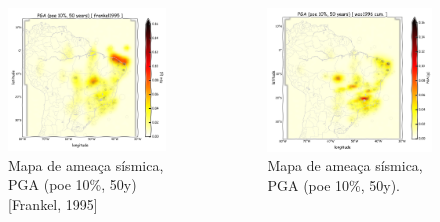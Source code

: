 \documentclass[final]{beamer}
\begin{document}
\begin{poster}
\begin{columns}[t,totalwidth=\textwidth]



\begin{figure}[H]
  \centering
  \includegraphics[width=.98\textwidth]{pga_frankel} 
  \caption{Mapa de ameaça sísmica, PGA (poe 10\%, 50y) [Frankel, 1995] }
  \label{fig:pga_fran} 
\end{figure}

\begin{figure}[H]
	\centering
	\includegraphics[width=.98\textwidth]{pga_woo_cum} 
	\caption{Mapa de ameaça sísmica, PGA (poe 10\%, 50y).}
	\label{fig:pga_woo_cum} 
\end{figure}


\end{columns}
\end{poster}
\end{document}

